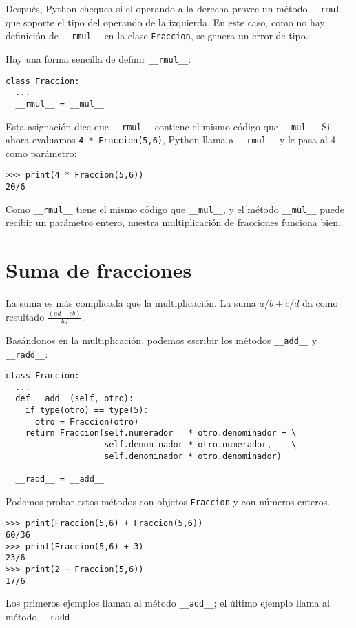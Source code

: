 Después, Python chequea si el operando a la derecha provee un método
\texttt{\_\_rmul\_\_} que soporte el tipo del operando de la izquierda.
En este caso, como no hay definición de \texttt{\_\_rmul\_\_} en la
clase \texttt{Fraccion}, se genera un error de tipo.

Hay una forma sencilla de definir \texttt{\_\_rmul\_\_}:
\begin{verbatim}
class Fraccion:
  ...
  __rmul__ = __mul__
\end{verbatim}
 Esta asignación dice que \texttt{\_\_rmul\_\_} contiene el mismo
código que \texttt{\_\_mul\_\_}. Si ahora evaluamos \texttt{4 {*}
Fraccion(5,6)}, Python llama a \texttt{\_\_rmul\_\_} y le pasa al
4 como parámetro:

\begin{verbatim}
>>> print(4 * Fraccion(5,6))
20/6
\end{verbatim}
 Como \texttt{\_\_rmul\_\_} tiene el mismo código que \texttt{\_\_mul\_\_},
y el método \texttt{\_\_mul\_\_} puede recibir un parámetro entero,
nuestra multiplicación de fracciones funciona bien.

\section{Suma de fracciones}

 

La suma es más complicada que la multiplicación. La suma $a/b+c/d$
da como resultado $\frac{(ad+cb)}{bd}$.

Basándonos en la multiplicación, podemos escribir los métodos \texttt{\_\_add\_\_}
y \texttt{\_\_radd\_\_}:

\begin{verbatim}
class Fraccion:
  ...
  def __add__(self, otro):
    if type(otro) == type(5):
      otro = Fraccion(otro)
    return Fraccion(self.numerador   * otro.denominador + \
                    self.denominador * otro.numerador,    \
                    self.denominador * otro.denominador) 

  __radd__ = __add__
\end{verbatim}
 Podemos probar estos métodos con objetos \texttt{Fraccion} y con
números enteros.

\begin{verbatim}
>>> print(Fraccion(5,6) + Fraccion(5,6))
60/36
>>> print(Fraccion(5,6) + 3)
23/6
>>> print(2 + Fraccion(5,6))
17/6
\end{verbatim}
 Los primeros ejemplos llaman al método \texttt{\_\_add\_\_}; el último
ejemplo llama al método \texttt{\_\_radd\_\_}.

